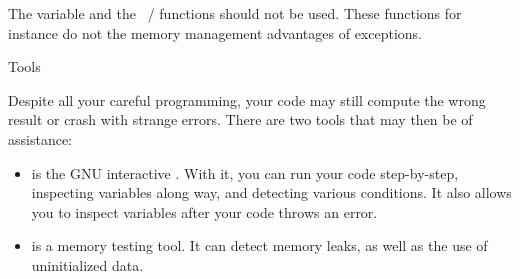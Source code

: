 The  variable and the
~/  functions should not be
used. These functions for instance do not the memory management
advantages of exceptions.

 {Tools}

Despite all your careful programming, your code may still compute the
wrong result or crash with strange errors. There are two tools that
may then be of assistance:
\begin{itemize}
\item {} is the GNU interactive
  . With it, you can run your code step-by-step,
  inspecting variables along way, and detecting various conditions. It
  also allows you to inspect variables after your code throws an
  error.
\item {} is a memory testing tool. It can detect
  memory leaks, as well as the use of uninitialized data.
\end{itemize}
